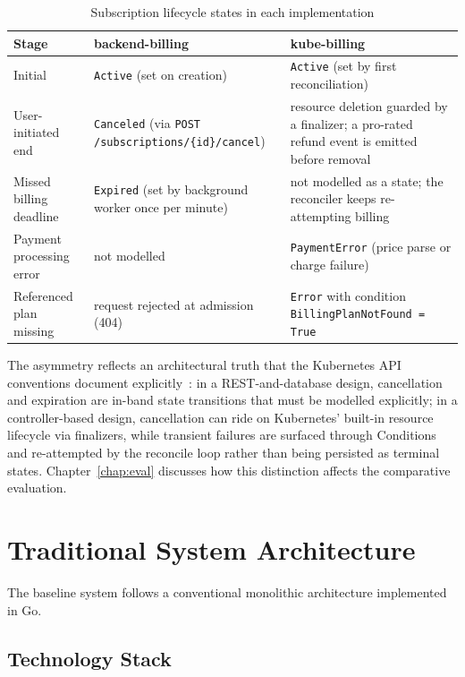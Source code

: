 \begin{table}[h]
\centering
\small
\caption{Subscription lifecycle states in each implementation}
\label{tab:state-comparison}
\begin{tabularx}{\textwidth}{@{}lXX@{}}
\toprule
\textbf{Stage} & \textbf{backend-billing} & \textbf{kube-billing} \\ \midrule
Initial & \texttt{Active} (set on creation) & \texttt{Active} (set by first reconciliation) \\
User-initiated end & \texttt{Canceled} (via \texttt{POST /subscriptions/\{id\}/cancel}) & resource deletion guarded by a finalizer; a pro-rated refund event is emitted before removal \\
Missed billing deadline & \texttt{Expired} (set by background worker once per minute) & not modelled as a state; the reconciler keeps re-attempting billing \\
Payment processing error & not modelled & \texttt{PaymentError} (price parse or charge failure) \\
Referenced plan missing & request rejected at admission (404) & \texttt{Error} with condition \texttt{BillingPlanNotFound = True} \\ \bottomrule
\end{tabularx}
\end{table}

The asymmetry reflects an architectural truth that the Kubernetes API conventions document explicitly~\cite{k8s_api_conventions, ibryam2020}: in a REST-and-database design, cancellation and expiration are in-band state transitions that must be modelled explicitly; in a controller-based design, cancellation can ride on Kubernetes' built-in resource lifecycle via finalizers, while transient failures are surfaced through Conditions and re-attempted by the reconcile loop rather than being persisted as terminal states. Chapter~\ref{chap:eval} discusses how this distinction affects the comparative evaluation.

\section{Traditional System Architecture}

The baseline system follows a conventional monolithic architecture implemented in Go.

\subsection{Technology Stack}

